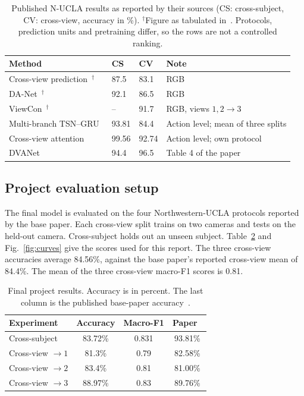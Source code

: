 \documentclass[runningheads]{llncs}
\begin{document}
\begin{table}[tb]
\caption{Published N-UCLA results as reported by their sources (CS: cross-subject, CV: cross-view, accuracy in \%). $^\dagger$Figure as tabulated in~\cite{dva}. Protocols, prediction units and pretraining differ, so the rows are not a controlled ranking.}\label{tab:pub}
\centering\small
\begin{tabular}{@{}p{4.0cm}p{1.1cm}p{1.1cm}p{4.9cm}@{}}
\toprule
Method & CS & CV & Note\\\midrule
Cross-view prediction~\cite{vyas}$^\dagger$ & 87.5 & 83.1 & RGB\\
DA-Net~\cite{danet}$^\dagger$ & 92.1 & 86.5 & RGB\\
ViewCon~\cite{viewcon}$^\dagger$ & -- & 91.7 & RGB, views $1,2\to3$\\
Multi-branch TSN--GRU~\cite{bui} & 93.81 & 84.4 & Action level; mean of three splits\\
Cross-view attention~\cite{cva} & 99.56 & 92.74 & Action level; own protocol\\
DVANet~\cite{dva} & 94.4 & 96.5 & Table 4 of the paper\\\bottomrule
\end{tabular}
\end{table}

\FloatBarrier
\subsection{Project evaluation setup}
The final model is evaluated on the four Northwestern-UCLA protocols reported by the base paper. Each cross-view split trains on two cameras and tests on the held-out camera. Cross-subject holds out an unseen subject. Table~\ref{tab:final} and Fig.~\ref{fig:curves} give the scores used for this report. The three cross-view accuracies average 84.56\%, against the base paper's reported cross-view mean of 84.4\%. The mean of the three cross-view macro-F1 scores is 0.81.

\begin{table}[tb]
\caption{Final project results. Accuracy is in percent. The last column is the published base-paper accuracy~\cite{bui}.}\label{tab:final}
\centering\small
\begin{tabular}{@{}lccc@{}}
\toprule
Experiment & Accuracy & Macro-F1 & Paper~\cite{bui}\\\midrule
Cross-subject & 83.72\% & 0.831 & 93.81\%\\
Cross-view $\to 1$ & 81.3\% & 0.79 & 82.58\%\\
Cross-view $\to 2$ & 83.4\% & 0.81 & 81.00\%\\
Cross-view $\to 3$ & 88.97\% & 0.83 & 89.76\%\\\bottomrule
\end{tabular}
\end{table}
\end{document}
